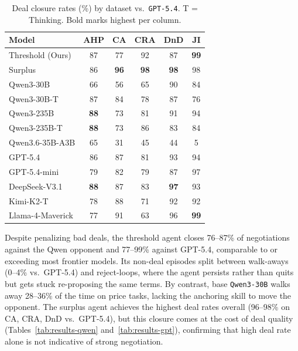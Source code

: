 \documentclass[11pt]{article}
\newcommand{\model}[1]{\texttt{#1}}
\newcommand{\lightrule}{\arrayrulecolor{black!20}\midrule\arrayrulecolor{black}}
\begin{document}
\begin{table}[ht]
\centering
\scriptsize
\setlength{\tabcolsep}{4pt}
\renewcommand{\arraystretch}{1.15}
\begin{tabular}{l ccccc}
\toprule
\rowcolor{tableheader}
\textbf{Model} & \textbf{AHP} & \textbf{CA} & \textbf{CRA} & \textbf{DnD} & \textbf{JI} \\
\midrule
\rowcolor{tablerow}
Threshold (Ours) & 87 & 77 & 92 & 87 & \textbf{99} \\
Surplus          & 86 & \textbf{96} & \textbf{98} & \textbf{98} & 98 \\
\lightrule
\rowcolor{tablerow}
Qwen3-30B        & 66 & 56 & 65 & 90 & 84 \\
Qwen3-30B-T      & 87 & 84 & 78 & 87 & 76 \\
\rowcolor{tablerow}
Qwen3-235B       & \textbf{88} & 73 & 81 & 91 & 94 \\
Qwen3-235B-T     & \textbf{88} & 73 & 86 & 83 & 84 \\
\rowcolor{tablerow}
Qwen3.6-35B-A3B  & 65 & 31 & 45 & 44 & 5 \\
GPT-5.4          & 86 & 87 & 81 & 93 & 94 \\
\rowcolor{tablerow}
GPT-5.4-mini     & 79 & 82 & 79 & 87 & 97 \\
DeepSeek-V3.1    & \textbf{88} & 87 & 83 & \textbf{97} & 93 \\
\rowcolor{tablerow}
Kimi-K2-T        & 78 & 88 & 71 & 92 & 92 \\
Llama-4-Maverick & 77 & 91 & 63 & 96 & \textbf{99} \\
\bottomrule
\end{tabular}
\caption{Deal closure rates (\%) by dataset vs.\ \model{GPT-5.4}. T = Thinking. Bold marks highest per column.}
\label{tab:deal_rates_gpt}
\end{table}

Despite penalizing bad deals, the threshold agent closes 76--87\% of negotiations against the Qwen opponent and 77--99\% against GPT-5.4, comparable to or exceeding most frontier models. Its non-deal episodes split between walk-aways (0--4\% vs.\ GPT-5.4) and reject-loops, where the agent persists rather than quits but gets stuck re-proposing the same terms. By contrast, base \model{Qwen3-30B} walks away 28--36\% of the time on price tasks, lacking the anchoring skill to move the opponent. The surplus agent achieves the highest deal rates overall (96--98\% on CA, CRA, DnD vs.\ GPT-5.4), but this closure comes at the cost of deal quality (Tables~\ref{tab:results-qwen} and~\ref{tab:results-gpt}), confirming that high deal rate alone is not indicative of strong negotiation.
\end{document}
